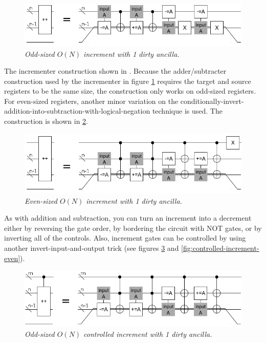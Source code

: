 \documentclass[twocolumn]{article}
\begin{document}
\begin{figure}
  \centering
  \includegraphics[totalheight=1.5cm]{compact-increment.png}
  \caption{\em Odd-sized $O(N)$ increment with 1 dirty ancilla.}
  \label{fig:compact-increment}
\end{figure}

The incrementer construction shown in .
Because the adder/subtracter construction used by the incrementer in figure \ref{fig:compact-increment} requires the target and source registers to be the same size, the construction only works on odd-sized registers.
For even-sized registers, another minor variation on the conditionally-invert-addition-into-subtraction-with-logical-negation technique is used.
The construction is shown in \ref{fig:compact-increment-even}.

\begin{figure}
  \centering
  \includegraphics[totalheight=2cm]{compact-increment-even.png}
  \caption{\em Even-sized $O(N)$ increment with 1 dirty ancilla.}
  \label{fig:compact-increment-even}
\end{figure}

As with addition and subtraction, you can turn an increment into a decrement either by reversing the gate order, by bordering the circuit with NOT gates, or by inverting all of the controls.
Also, increment gates can be controlled by using another invert-input-and-output trick (see figures \ref{fig:controlled-increment-odd} and \ref{fig:controlled-increment-even}).

\begin{figure}
  \centering
  \includegraphics[totalheight=2cm]{controlled-increment-odd.png}
  \caption{\em Odd-sized $O(N)$ controlled increment with 1 dirty ancilla.}
  \label{fig:controlled-increment-odd}
\end{figure}
\end{document}
